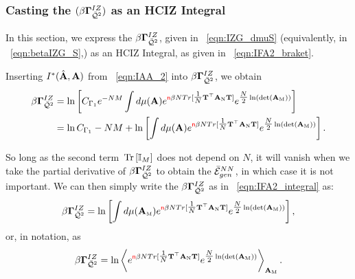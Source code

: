 \subsubsection{Casting the \GeneratingFunction \texorpdfstring{$(\beta\mathbf{\Gamma}^{IZ}_{\bar{\mathcal{Q}}^{2}})$}{beta G} as an HCIZ Integral}
\label{sxn:TraceLogDerivation_B}

In this section, we express the \GeneratingFunction $\beta\mathbf{\Gamma}^{IZ}_{\bar{\mathcal{Q}}^{2}}$, 
given in \EQN~\ref{eqn:IZG_dmuS} (equivalently, in \EQN~\ref{eqn:betaIZG_S},) 
as an HCIZ Integral, 
as given in \EQN~\ref{eqn:IFA2_braket}.

Inserting $I^{*}(\hat{\mathbf{A}},\mathbf{A})$ from \EQN~\ref{eqn:IAA_2} into $\beta\mathbf{\Gamma}^{IZ}_{\bar{\mathcal{Q}}^{2}}$, we obtain
\begin{align}
  \label{eqn:IZG_IAA}
  \IZG 
  & =  \ln \left[ C_{\Gamma_1} e^{-NM}\int d\mu(\AMAT)
  e^{\ND\beta N Tr[ \tfrac{1}{N}\TMAT^{\top}\AMATN\TMAT] }
  e^{\tfrac{N}{2}\ln(\Det{\AMATM})}\right]  \\ \nonumber
  & =
    \ln  C_{\Gamma_1}
  - NM
  +  \ln \left[ \int d\mu(\AMAT)
    e^{\ND\beta N Tr[ \tfrac{1}{N}\TMAT^{\top}\AMATN\TMAT] }
    e^{\tfrac{N}{2}\ln(\Det{\AMATM})}\right]  .
\end{align}

\noindent
So long as the second term $\mbox{}\operatorname{Tr}\left[\mathbb{I}_{M}\right]$ does not depend on $N$, 
it will vanish when we take the partial derivative of $\beta\mathbf{\Gamma}^{IZ}_{\bar{\mathcal{Q}}^{2}}$ to obtain the $\bar{\mathcal{E}}^{NN}_{gen}$, in which case it is not important.  
We can then simply write the \GeneratingFunction $\beta\mathbf{\Gamma}^{IZ}_{\bar{\mathcal{Q}}^{2}}$  as in \EQN~\ref{eqn:IFA2_integral} as:
\begin{align}
  \label{eqn:IZG_integral}
  \IZG 
   =  \ln \left[ \int d\mu(\AMATM)
    e^{\ND\beta N Tr[ \tfrac{1}{N}\TMAT^{\top}\AMATN\TMAT] }
    e^{\tfrac{N}{2}\ln(\Det{\AMATM})}\right]  ,
\end{align}
or, in \BraKet notation, as
\begin{align}
  \label{eqn:IZG_braket}
  \IZG = 
   \ln\left\langle
  e^{\ND\beta N Tr[ \tfrac{1}{N}\TMAT^{\top}\AMATN\TMAT] }
  e^{\tfrac{N}{2}\ln(\Det{\AMATM})}
  \right\rangle_{\AMATM}   .
\end{align}


